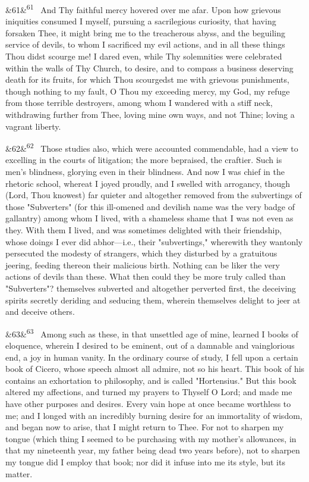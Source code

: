 \documentclass[12pt]{article}
\newcommand{\para}[1][]{\par\noindent\ifx&#1&\else\textsuperscript{\footnotesize #1}~\fi}
\begin{document}
\para[61] And Thy faithful mercy hovered over me afar. Upon how grievous iniquities consumed I myself, pursuing a sacrilegious curiosity, that having forsaken Thee, it might bring me to the treacherous abyss, and the beguiling service of devils, to whom I sacrificed my evil actions, and in all these things Thou didst scourge me! I dared even, while Thy solemnities were celebrated within the walls of Thy Church, to desire, and to compass a business deserving death for its fruits, for which Thou scourgedst me with grievous punishments, though nothing to my fault, O Thou my exceeding mercy, my God, my refuge from those terrible destroyers, among whom I wandered with a stiff neck, withdrawing further from Thee, loving mine own ways, and not Thine; loving a vagrant liberty.

\para[62] Those studies also, which were accounted commendable, had a view to excelling in the courts of litigation; the more bepraised, the craftier. Such is men's blindness, glorying even in their blindness. And now I was chief in the rhetoric school, whereat I joyed proudly, and I swelled with arrogancy, though (Lord, Thou knowest) far quieter and altogether removed from the subvertings of those "Subverters" (for this ill-omened and devilish name was the very badge of gallantry) among whom I lived, with a shameless shame that I was not even as they. With them I lived, and was sometimes delighted with their friendship, whose doings I ever did abhor---i.e., their "subvertings," wherewith they wantonly persecuted the modesty of strangers, which they disturbed by a gratuitous jeering, feeding thereon their malicious birth. Nothing can be liker the very actions of devils than these. What then could they be more truly called than "Subverters"? themselves subverted and altogether perverted first, the deceiving spirits secretly deriding and seducing them, wherein themselves delight to jeer at and deceive others.

\para[63] Among such as these, in that unsettled age of mine, learned I books of eloquence, wherein I desired to be eminent, out of a damnable and vainglorious end, a joy in human vanity. In the ordinary course of study, I fell upon a certain book of Cicero, whose speech almost all admire, not so his heart. This book of his contains an exhortation to philosophy, and is called "Hortensius." But this book altered my affections, and turned my prayers to Thyself O Lord; and made me have other purposes and desires. Every vain hope at once became worthless to me; and I longed with an incredibly burning desire for an immortality of wisdom, and began now to arise, that I might return to Thee. For not to sharpen my tongue (which thing I seemed to be purchasing with my mother's allowances, in that my nineteenth year, my father being dead two years before), not to sharpen my tongue did I employ that book; nor did it infuse into me its style, but its matter.
\end{document}
